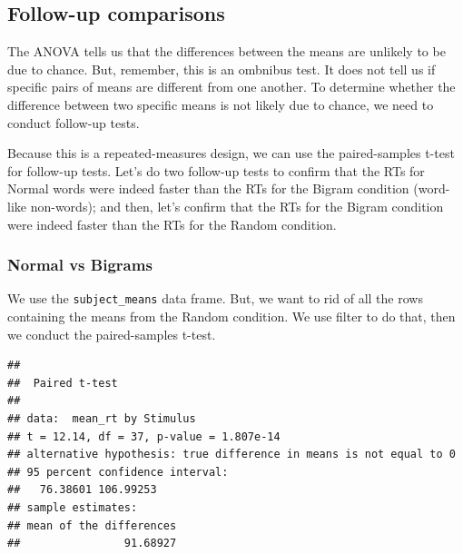 \documentclass[]{book}
\newenvironment{Shaded}{\begin{snugshade}}{\end{snugshade}}
\newcommand{\KeywordTok}[1]{\textcolor[rgb]{0.13,0.29,0.53}{\textbf{{#1}}}}
\newcommand{\DataTypeTok}[1]{\textcolor[rgb]{0.13,0.29,0.53}{{#1}}}
\newcommand{\StringTok}[1]{\textcolor[rgb]{0.31,0.60,0.02}{{#1}}}
\newcommand{\OtherTok}[1]{\textcolor[rgb]{0.56,0.35,0.01}{{#1}}}
\newcommand{\NormalTok}[1]{{#1}}
\theoremstyle{definition}
\theoremstyle{definition}
\theoremstyle{definition}
\theoremstyle{remark}
\begin{document}
\subsection{Follow-up comparisons}\label{follow-up-comparisons}

The ANOVA tells us that the differences between the means are unlikely
to be due to chance. But, remember, this is an ombnibus test. It does
not tell us if specific pairs of means are different from one another.
To determine whether the difference between two specific means is not
likely due to chance, we need to conduct follow-up tests.

Because this is a repeated-measures design, we can use the
paired-samples t-test for follow-up tests. Let's do two follow-up tests
to confirm that the RTs for Normal words were indeed faster than the RTs
for the Bigram condition (word-like non-words); and then, let's confirm
that the RTs for the Bigram condition were indeed faster than the RTs
for the Random condition.

\subsubsection{Normal vs Bigrams}\label{normal-vs-bigrams}

We use the \texttt{subject\_means} data frame. But, we want to rid of
all the rows containing the means from the Random condition. We use
filter to do that, then we conduct the paired-samples t-test.

\begin{Shaded}
\end{Shaded}

\begin{verbatim}
## 
##  Paired t-test
## 
## data:  mean_rt by Stimulus
## t = 12.14, df = 37, p-value = 1.807e-14
## alternative hypothesis: true difference in means is not equal to 0
## 95 percent confidence interval:
##   76.38601 106.99253
## sample estimates:
## mean of the differences 
##                91.68927
\end{verbatim}
\end{document}
